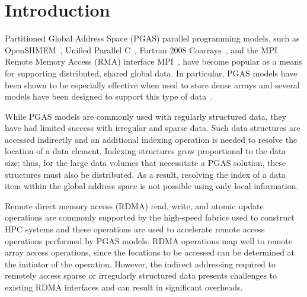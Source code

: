 \section{Introduction}

Partitioned Global Address Space (PGAS) parallel programming models, such as
OpenSHMEM~\cite{openshmem-1.3}, Unified Parallel C~\cite{upc-13-spec}, Fortran
2008 Coarrays~\cite{reid:08,fortran-2008}, and the MPI Remote Memory Access
(RMA) interface MPI~\cite{mpi-forum:15}, have become popular as a means for
supporting distributed, shared global data.  In particular, PGAS models have
been shown to be especially effective when used to store dense arrays and
several models have been designed to support this type of
data~\cite{ga,kamil:14,ddi,niu:16}.

While PGAS models are commonly used with regularly structured data, they have
had limited success with irregular and sparse data.  Such data structures are
accessed indirectly and an additional indexing operation is needed to resolve
the location of a data element.  Indexing structures grow proportional to the
data size; thus, for the large data volumes that necessitate a PGAS solution, these
structures must also be distributed.  As a result, resolving the index of a data item
within the global address space is not possible using only local information.

Remote direct memory access (RDMA) read, write, and atomic update operations
are commonly supported by the high-speed fabrics used to construct HPC systems
and these operations are used to accelerate remote access operations performed
by PGAS models.  RDMA operations map well to remote array access operations,
since the locations to be accessed can be determined at the initiator of the
operation.  However, the indirect addressing required to remotely access sparse or
irregularly structured data presents challenges to existing RDMA interfaces
and can result in significant overheads.




